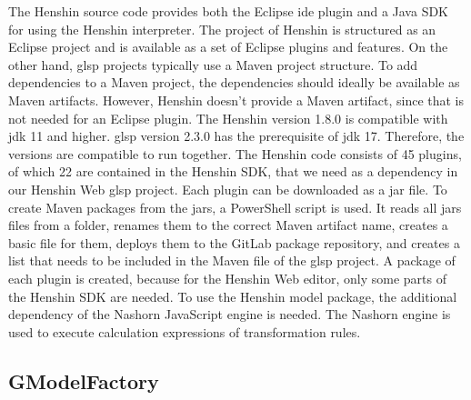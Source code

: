   The Henshin source code provides both the Eclipse \ac{ide} plugin and a Java SDK for using the Henshin interpreter. The project of Henshin is structured as an Eclipse project and is available as a set of Eclipse plugins and features. \cite{henshin-repo} On the other hand, \ac{glsp} projects typically use a Maven project structure. \cite{glsp-repo} To add dependencies to a Maven project, the dependencies should ideally be available as Maven artifacts. However, Henshin doesn't provide a Maven artifact, since that is not needed for an Eclipse plugin. The Henshin version 1.8.0 is compatible with \acs{jdk} 11 and higher. \ac{glsp} version 2.3.0 has the prerequisite of \acs{jdk} 17. Therefore, the versions are compatible to run together. The Henshin code consists of 45 plugins, of which 22 are contained in the Henshin SDK, that we need as a dependency in our Henshin Web \ac{glsp} project. Each plugin can be downloaded as a \acs{jar} file. To create Maven packages from the \acsp{jar}, a PowerShell script is used. It reads all \acsp{jar} files from a folder, renames them to the correct Maven artifact name, creates a basic  file for them, deploys them to the GitLab package repository, and creates a list that needs to be included in the Maven  file of the \ac{glsp} project. A package of each plugin is created, because for the Henshin Web editor, only some parts of the Henshin SDK are needed. To use the Henshin model package, the additional dependency of the Nashorn JavaScript engine \cite{nashorn-repo} is needed. The Nashorn engine is used to execute calculation expressions of transformation rules. \cite{henshin}

  \subsection{GModelFactory}
  \label{subsec:gmodel-factory}

